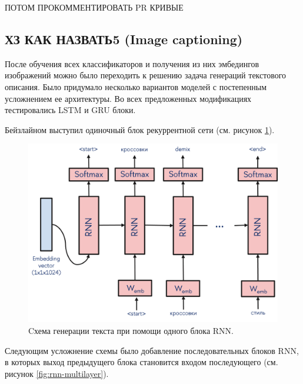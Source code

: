 \documentclass[a4paper,12pt]{extarticle}
\begin{document}
ПОТОМ ПРОКОММЕНТИРОВАТЬ PR КРИВЫЕ

\subsection{ХЗ КАК НАЗВАТЬ5 (Image captioning)}
После обучения всех классификаторов и получения из них эмбедингов изображений можно было переходить к решению задача генераций текстового описания. Было придумало несколько вариантов моделей с постепенным усложнением ее архитектуры. Во всех предложенных модификациях тестировались LSTM и GRU блоки.

Бейзлайном выступил одиночный блок рекуррентной сети (см. рисунок \ref{fig:rnn_one}).
\begin{figure}[ht]
	\centering
	\includegraphics[scale=0.7]{rnn_one.png}
	\caption{Cхема генерации текста при помощи одного блока RNN.}
	\label{fig:rnn_one}
\end{figure}
Следующим усложнение схемы было добавление последовательных блоков RNN, в которых выход предыдущего блока становится входом последующего (см. рисунок \ref{fig:rnn-multilayer}).
\end{document}
